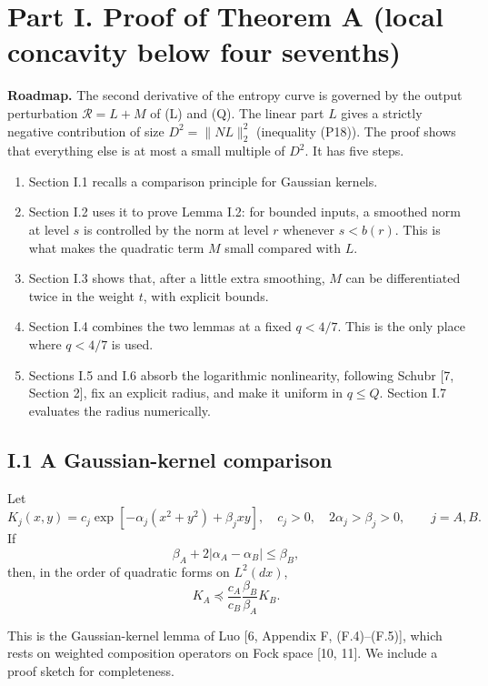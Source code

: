 \documentclass[
  british,
  10pt,
]{article}
\providecommand{\tightlist}{%
  \setlength{\itemsep}{0pt}\setlength{\parskip}{0pt}}
\begin{document}
\section{Part I. Proof of Theorem A (local concavity below four
sevenths)}\label{part-i.-proof-of-theorem-a-local-concavity-below-four-sevenths}

\textbf{Roadmap.} The second derivative of the entropy curve is governed
by the output perturbation \(\mathcal R=L+M\) of (L) and (Q). The linear
part \(L\) gives a strictly negative contribution of size
\(D^2=\|NL\|_2^2\) (inequality (P18)). The proof shows that everything
else is at most a small multiple of \(D^2\). It has five steps.

\begin{enumerate}
\def\labelenumi{\arabic{enumi}.}
\tightlist
\item
  Section I.1 recalls a comparison principle for Gaussian kernels.
\item
  Section I.2 uses it to prove Lemma I.2: for bounded inputs, a smoothed
  norm at level \(s\) is controlled by the norm at level \(r\) whenever
  \(s<b(r)\). This is what makes the quadratic term \(M\) small compared
  with \(L\).
\item
  Section I.3 shows that, after a little extra smoothing, \(M\) can be
  differentiated twice in the weight \(t\), with explicit bounds.
\item
  Section I.4 combines the two lemmas at a fixed \(q<4/7\). This is the
  only place where \(q<4/7\) is used.
\item
  Sections I.5 and I.6 absorb the logarithmic nonlinearity, following
  Schubr {[}7, Section 2{]}, fix an explicit radius, and make it uniform
  in \(q\le Q\). Section I.7 evaluates the radius numerically.
\end{enumerate}

\subsection{I.1 A Gaussian-kernel
comparison}\label{i.1-a-gaussian-kernel-comparison}

Let \[
K_j(x,y)=c_j\exp[-\alpha_j(x^2+y^2)+\beta_jxy],
\quad c_j>0,\quad 2\alpha_j>\beta_j>0,\qquad j=A,B.
\tag{P1}
\] If \[
\beta_A+2|\alpha_A-\alpha_B|\le\beta_B,                   \tag{P2}
\] then, in the order of quadratic forms on \(L^2(dx)\), \[
K_A\preceq
\frac{c_A}{c_B}\frac{\beta_B}{\beta_A}K_B.                \tag{P3}
\]

This is the Gaussian-kernel lemma of Luo {[}6, Appendix F,
(F.4)--(F.5){]}, which rests on weighted composition operators on Fock
space {[}10, 11{]}. We include a proof sketch for completeness.
\end{document}
